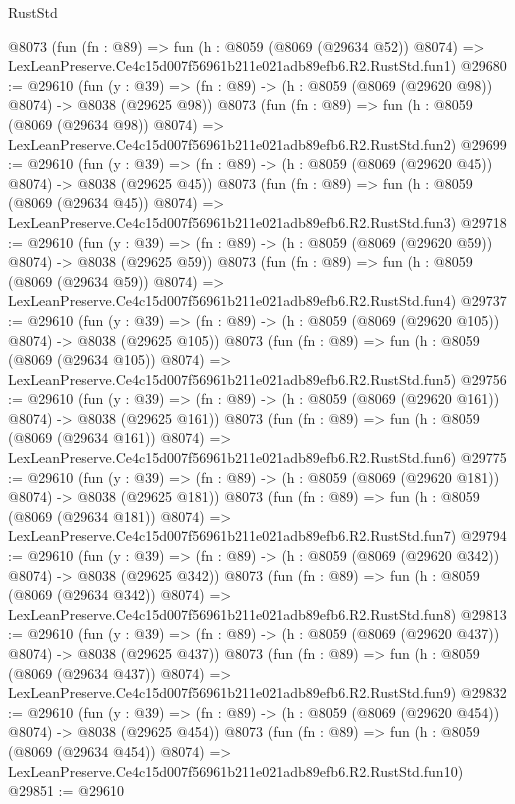 \begin{lexlean}{RustStd}
\begin{coremodule}
    @8073
    (fun (fn : @89) =>
    fun (h : @8059 (@8069 (@29634 @52)) @8074) =>
    LexLeanPreserve.Ce4c15d007f56961b211e021adb89efb6.R2.RustStd.fun1)
@29680 := @29610
    (fun (y : @39) => (fn : @89) -> (h : @8059 (@8069 (@29620 @98)) @8074) -> @8038 (@29625 @98))
    @8073
    (fun (fn : @89) =>
    fun (h : @8059 (@8069 (@29634 @98)) @8074) =>
    LexLeanPreserve.Ce4c15d007f56961b211e021adb89efb6.R2.RustStd.fun2)
@29699 := @29610
    (fun (y : @39) => (fn : @89) -> (h : @8059 (@8069 (@29620 @45)) @8074) -> @8038 (@29625 @45))
    @8073
    (fun (fn : @89) =>
    fun (h : @8059 (@8069 (@29634 @45)) @8074) =>
    LexLeanPreserve.Ce4c15d007f56961b211e021adb89efb6.R2.RustStd.fun3)
@29718 := @29610
    (fun (y : @39) => (fn : @89) -> (h : @8059 (@8069 (@29620 @59)) @8074) -> @8038 (@29625 @59))
    @8073
    (fun (fn : @89) =>
    fun (h : @8059 (@8069 (@29634 @59)) @8074) =>
    LexLeanPreserve.Ce4c15d007f56961b211e021adb89efb6.R2.RustStd.fun4)
@29737 := @29610
    (fun (y : @39) => (fn : @89) -> (h : @8059 (@8069 (@29620 @105)) @8074) -> @8038 (@29625 @105))
    @8073
    (fun (fn : @89) =>
    fun (h : @8059 (@8069 (@29634 @105)) @8074) =>
    LexLeanPreserve.Ce4c15d007f56961b211e021adb89efb6.R2.RustStd.fun5)
@29756 := @29610
    (fun (y : @39) => (fn : @89) -> (h : @8059 (@8069 (@29620 @161)) @8074) -> @8038 (@29625 @161))
    @8073
    (fun (fn : @89) =>
    fun (h : @8059 (@8069 (@29634 @161)) @8074) =>
    LexLeanPreserve.Ce4c15d007f56961b211e021adb89efb6.R2.RustStd.fun6)
@29775 := @29610
    (fun (y : @39) => (fn : @89) -> (h : @8059 (@8069 (@29620 @181)) @8074) -> @8038 (@29625 @181))
    @8073
    (fun (fn : @89) =>
    fun (h : @8059 (@8069 (@29634 @181)) @8074) =>
    LexLeanPreserve.Ce4c15d007f56961b211e021adb89efb6.R2.RustStd.fun7)
@29794 := @29610
    (fun (y : @39) => (fn : @89) -> (h : @8059 (@8069 (@29620 @342)) @8074) -> @8038 (@29625 @342))
    @8073
    (fun (fn : @89) =>
    fun (h : @8059 (@8069 (@29634 @342)) @8074) =>
    LexLeanPreserve.Ce4c15d007f56961b211e021adb89efb6.R2.RustStd.fun8)
@29813 := @29610
    (fun (y : @39) => (fn : @89) -> (h : @8059 (@8069 (@29620 @437)) @8074) -> @8038 (@29625 @437))
    @8073
    (fun (fn : @89) =>
    fun (h : @8059 (@8069 (@29634 @437)) @8074) =>
    LexLeanPreserve.Ce4c15d007f56961b211e021adb89efb6.R2.RustStd.fun9)
@29832 := @29610
    (fun (y : @39) => (fn : @89) -> (h : @8059 (@8069 (@29620 @454)) @8074) -> @8038 (@29625 @454))
    @8073
    (fun (fn : @89) =>
    fun (h : @8059 (@8069 (@29634 @454)) @8074) =>
    LexLeanPreserve.Ce4c15d007f56961b211e021adb89efb6.R2.RustStd.fun10)
@29851 := @29610

\end{coremodule}
\end{lexlean}
